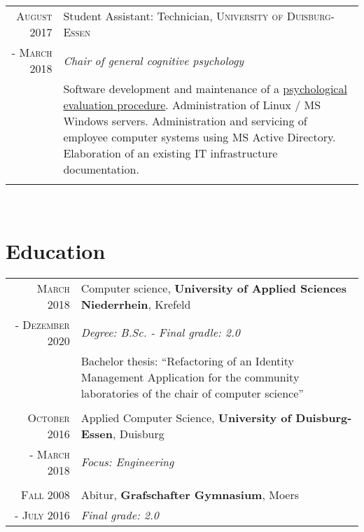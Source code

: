 \documentclass[10pt,a4paper]{article}
\begin{document}
\begin{tabular}{r|p{11cm}}
	 \textsc{August} 2017	& Student Assistant: Technician, \textsc{University of Duisburg-Essen} \\
	 - \textsc{March} 2018	& \emph{Chair of general cognitive psychology} \\
	 & \footnotesize{Software development and maintenance of a \href{https://gdt.allgpsy.uni-due.de}{psychological evaluation procedure}. Administration of Linux / MS Windows servers. Administration and servicing of employee computer systems using MS Active Directory. Elaboration of an existing IT infrastructure documentation.} \\
	 \multicolumn{2}{c}{} \\
\end{tabular} \\


\section{Education}

\begin{tabular}{r|p{11cm}}
	
	\textsc{March} 2018		& Computer science, \textbf{University of Applied Sciences Niederrhein}, Krefeld \\
	- \textsc{Dezember 2020}	& \emph{Degree: B.Sc. - Final gradle: 2.0} \\
						& Bachelor thesis: ``Refactoring of an Identity Management Application for the community laboratories of the chair of computer science'' \\
	\multicolumn{2}{c}{} \\
	
	\textsc{October} 2016	& Applied Computer Science, \textbf{University of Duisburg-Essen}, Duisburg \\
	- \textsc{March} 2018	& \emph{Focus: Engineering} \\
	\multicolumn{2}{c}{} \\
	
	\textsc{Fall} 2008		& Abitur, \textbf{Grafschafter Gymnasium}, Moers \\
	- \textsc{July} 2016		& \emph{Final grade: 2.0} \\
\end{tabular} \\
\end{document}
